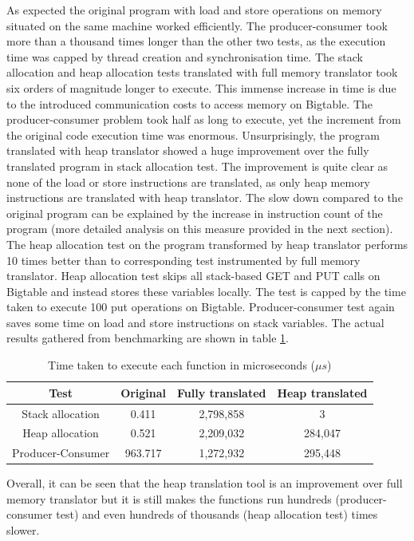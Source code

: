 \documentclass[bsc,frontabs,twoside,singlespacing,parskip,deptreport]{infthesis}     %
\begin{document}
As expected the original program with load and store operations on memory situated on the same machine worked efficiently. The producer-consumer took more than a thousand times longer than the other two tests, as the execution time was capped by thread creation and synchronisation time. The stack allocation and heap allocation tests translated with full memory translator took six orders of magnitude longer to execute. This immense increase in time is due to the introduced communication costs to access memory on Bigtable. The producer-consumer problem took half as long to execute, yet the increment from the original code execution time was enormous. Unsurprisingly, the program translated with heap translator showed a huge improvement over the fully translated program in stack allocation test. The improvement is quite clear as none of the load or store instructions are translated, as only heap memory instructions are translated with heap translator. The slow down compared to the original program can be explained by the increase in instruction count of the program (more detailed analysis on this measure provided in the next section). The heap allocation test on the program transformed by heap translator performs 10 times better than to corresponding test instrumented by full memory translator. Heap allocation test skips all stack-based GET and PUT calls on Bigtable and instead stores these variables locally. The test is capped by the time taken to execute 100 put operations on Bigtable. Producer-consumer test again saves some time on load and store instructions on stack variables. The actual results gathered from benchmarking are shown in table \ref{table:performance}.

\begin{table}[h]
\centering
\begin{tabular}{ c | c c c }
Test & Original & Fully translated & Heap translated \\
\hline
Stack allocation & 0.411 & 2,798,858 & 3 \\
Heap allocation & 0.521 & 2,209,032 & 284,047 \\
Producer-Consumer & 963.717 & 1,272,932 & 295,448
\end{tabular}
\caption{Time taken to execute each function in microseconds ($\mu s$)}
\label{table:performance}
\end{table}

Overall, it can be seen that the heap translation tool is an improvement over full memory translator but it is still makes the functions run hundreds (producer-consumer test) and even hundreds of thousands (heap allocation test) times slower.
\end{document}
